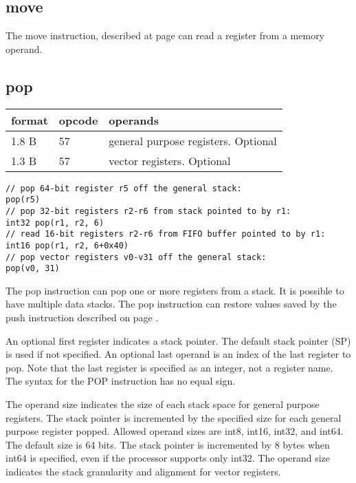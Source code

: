 \documentclass[forwardcom.tex]{subfiles}
\begin{document}
\subsection{move}
The move instruction, described at page \pageref{table:moveInstruction}
can read a register from a memory operand.

\subsection{pop}
\label{table:popInstruction}
\begin{tabular}{|p{12mm}|p{15mm}|p{100mm}|}
\hline
\bfseries format & \bfseries opcode & \bfseries operands \\ \hline
1.8 B & 57 & general purpose registers. Optional \\ 
1.3 B & 57 & vector registers. Optional \\ \hline
\end{tabular}
\vv

\begin{lstlisting}[frame=none]
// pop 64-bit register r5 off the general stack:
pop(r5)
// pop 32-bit registers r2-r6 from stack pointed to by r1:
int32 pop(r1, r2, 6)
// read 16-bit registers r2-r6 from FIFO buffer pointed to by r1:
int16 pop(r1, r2, 6+0x40)
// pop vector registers v0-v31 off the general stack:
pop(v0, 31)
\end{lstlisting}
\vv

The pop instruction can pop one or more registers from a stack. It is possible to have multiple data stacks. 
The pop instruction can restore values saved by the push instruction described on page \pageref{table:pushInstruction}.
\vv

An optional first register indicates a stack pointer. The default stack pointer (SP) is used if not specified. An optional last operand is an index of the last register to pop. Note that the last register is specified as an integer, not a register name.  The syntax for the POP instruction has no equal sign.
\vv

The operand size indicates the size of each stack space for general purpose registers. The stack pointer is incremented by the specified size for each general purpose register popped. Allowed operand sizes are int8, int16, int32, and int64. The default size is 64 bits. The stack pointer is incremented by 8 bytes when int64 is specified, even if the processor supports only int32. The operand size indicates the stack granularity and alignment for vector registers.
\vv
\end{document}
